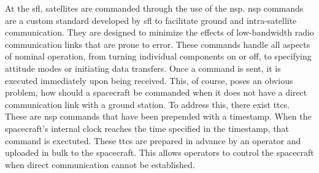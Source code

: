 At the \gls{sfl}, satellites are commanded through the use of the \gls{nsp}.
\gls{nsp} commands are a custom standard developed by \gls{sfl} to facilitate
ground and intra-satellite communication. They are designed to minimize the
effects of low-bandwidth radio communication links that are prone to error.
These commands handle all aspects of nominal operation, from turning individual
components on or off, to specifying attitude modes or initiating data
transfers. Once a command is sent, it is executed immediately upon being
received. This, of course, poses an obvious problem, how should a spacecraft be
commanded when it does not have a direct communication link with a ground
station. To address this, there exist \glspl{ttc}. These are \gls{nsp} commands
that have been prepended with a timestamp. When the spacecraft's internal clock
reaches the time specified in the timestamp, that command is exectuted. These
\glspl{ttc} are prepared in advance by an operator and uploaded in bulk to the
spacecraft. This allows operators to control the spacecraft when direct
communication cannot be established.



